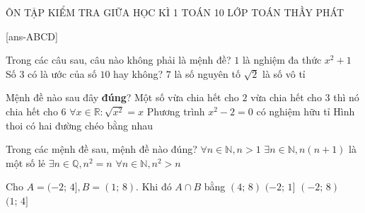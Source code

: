 \begin{name}
	{ÔN TẬP KIỂM TRA GIỮA HỌC KÌ 1}
	{TOÁN 10}
	{LỚP TOÁN THẦY PHÁT}
	{\thoigian}
\end{name}

\caulc

[ans-ABCD]
\begin{ex}%
	Trong các câu sau, câu nào không phải là mệnh đề?
	\choice
	{$1$ là nghiệm đa thức $x^2+1$}
	{\True Số $3$ có là ước của số $10$ hay không?}
	{$7$ là số nguyên tố}
	{$\sqrt{2}$ là số vô tỉ}
\end{ex}
\begin{ex}%
	Mệnh đề nào sau đây \textbf{đúng}?
	\choice
	{\True Một số vừa chia hết cho $2$ vừa chia hết cho $3$ thì nó chia hết cho $6$}
	{$\forall x\in\mathbb{R}:\sqrt{x^2}=x$}
	{Phương trình $x^2-2=0$ có nghiệm hữu tỉ}
	{Hình thoi có hai đường chéo bằng nhau}
\end{ex}
\begin{ex}%
	Trong các mệnh đề sau, mệnh đề nào đúng?
	\choice
	{$\forall n\in\mathbb{N}, n > 1$}
	{$\exists n\in\mathbb{N}, n(n+1)$ là một số lẻ}
	{\True $\exists n\in\mathbb{Q}, n^2=n$}
	{$\forall n\in\mathbb{N}, n^2> n$}
\end{ex}
\begin{ex}%
	Cho $A=(-2;\,4], B=(1;\,8)$. Khi đó $A\cap B$ bằng
\choice
{$(4;\,8)$}
{$(-2;\,1]$}
{$(-2;\,8)$}
{\True $(1;\,4]$}
\loigiai{
	Ta có $A\cap B=(1;\,4]$.
}
\end{ex}
